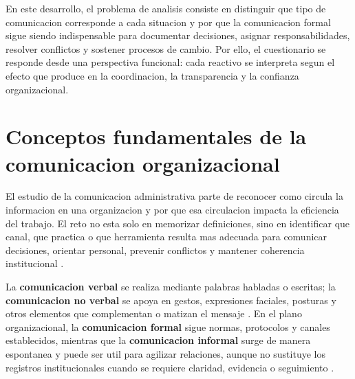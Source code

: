 \documentclass[
	spanish,
	letterpaper, oneside
]{article}
\begin{document}
En este desarrollo, el problema de analisis consiste en distinguir que tipo de comunicacion corresponde a cada situacion y por que la comunicacion formal sigue siendo indispensable para documentar decisiones, asignar responsabilidades, resolver conflictos y sostener procesos de cambio. Por ello, el cuestionario se responde desde una perspectiva funcional: cada reactivo se interpreta segun el efecto que produce en la coordinacion, la transparencia y la confianza organizacional.

%
%
\section{Conceptos fundamentales de la comunicacion organizacional}

El estudio de la comunicacion administrativa parte de reconocer como circula la informacion en una organizacion y por que esa circulacion impacta la eficiencia del trabajo. El reto no esta solo en memorizar definiciones, sino en identificar que canal, que practica o que herramienta resulta mas adecuada para comunicar decisiones, orientar personal, prevenir conflictos y mantener coherencia institucional \citep{robbins2017administracion}.

La \textbf{comunicacion verbal} se realiza mediante palabras habladas o escritas; la \textbf{comunicacion no verbal} se apoya en gestos, expresiones faciales, posturas y otros elementos que complementan o matizan el mensaje \citep{chiavenato2019introduccion}. En el plano organizacional, la \textbf{comunicacion formal} sigue normas, protocolos y canales establecidos, mientras que la \textbf{comunicacion informal} surge de manera espontanea y puede ser util para agilizar relaciones, aunque no sustituye los registros institucionales cuando se requiere claridad, evidencia o seguimiento \citep{daft2019teoria}.
\end{document}
